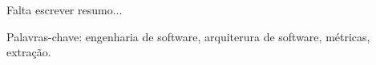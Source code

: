 \capa
\folhaderosto

\begin{resumo}
 Falta escrever resumo...

 Palavras-chave: engenharia de software, arquiterura de software, métricas, extração.
\end{resumo}

\sumario
